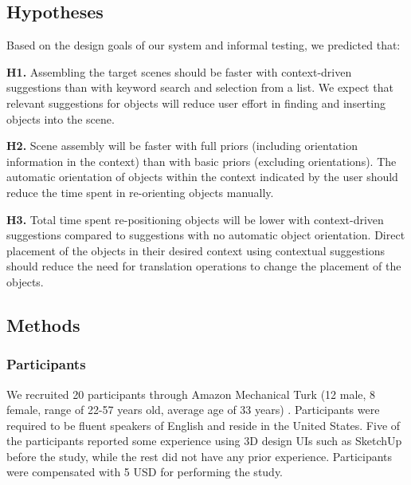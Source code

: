\documentclass{sigchi}
\begin{document}
\subsection{Hypotheses}
Based on the design goals of our system and informal testing, we predicted that:

\textbf{H1.} Assembling the target scenes should be faster with context-driven suggestions than with keyword search and selection from a list.  We expect that relevant suggestions for objects will reduce user effort in finding and inserting objects into the scene.

\textbf{H2.} Scene assembly will be faster with full priors (including orientation information in the context) than with basic priors (excluding orientations).  The automatic orientation of objects within the context indicated by the user should reduce the time spent in re-orienting objects manually.

\textbf{H3.} Total time spent re-positioning objects will be lower with context-driven suggestions compared to suggestions with no automatic object orientation.  Direct placement of the objects in their desired context using contextual suggestions should reduce the need for translation operations to change the placement of the objects.

\subsection{Methods}
\subsubsection{Participants}
We recruited 20 participants through Amazon Mechanical Turk (12 male, 8 female, range of 22-57 years old, average age of 33 years) .  Participants were required to be fluent speakers of English and reside in the United States.  Five of the participants reported some experience using 3D design UIs such as SketchUp before the study, while the rest did not have any prior experience.  Participants were compensated with 5 USD for performing the study.
\end{document}
